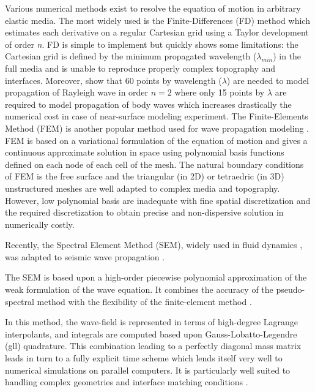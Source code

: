 \documentclass[manuscript,revised]{geophysics}
\begin{document}
\noindent Various numerical methods exist to resolve the equation of motion in arbitrary elastic media. The most widely used is the Finite-Differences (FD) method \citep{Virieux_PSV_1986,Levander_PSV_1988,Robertsson_FDM_1994,Pratt_EWM_1990,Stekl_VEM_1998,Saenger_FDM_2004} which estimates each derivative on a regular Cartesian grid using a Taylor development \citep{Moczo_FDM_2004} of order \textit{n}. FD is simple to implement but quickly shows some limitations: the Cartesian grid is defined by the minimum propagated wavelength ($\lambda_{min}$) in the full media and is unable to reproduce properly complex topography and interfaces. Moreover, \citet{Saenger_FDM_2000} show that 60 points by wavelength ($\lambda$) are needed to model propagation of Rayleigh wave in order $n=2$ where only 15 points by $\lambda$ are required to model propagation of body waves which increases drastically the numerical cost in case of near-surface modeling experiment. The Finite-Elements Method (FEM) is another popular method used for wave propagation modeling \citep{Lysmer_FEM_1972,Seron_FEM_1990,Hulbert_FEM_1990}. FEM is based on a variational formulation of the equation of motion and gives a continuous approximate solution in space using polynomial basis functions defined on each node of each cell of the mesh. The natural boundary conditions of FEM is the free surface and the triangular (in 2D) or tetraedric (in 3D) unstructured meshes are well adapted to complex media and topography. However, low polynomial basis are inadequate with fine spatial discretization and the required discretization to obtain precise and non-dispersive solution in numerically costly. 

\noindent Recently, the Spectral Element Method (SEM), widely used in fluid dynamics \citep{Patera_SEM_1984,Korczak_SEM_1986,Karniadakis_FEM_1989}, was adapted to seismic wave propagation \citep{Komatitsch_SEM_1998,Komatitsch_ISM_1999,Komatitsch_SEM_2005,Festa_PML_2005}. 

\noindent The SEM is based upon a high-order piecewise polynomial approximation of the weak formulation of the wave equation. It combines the accuracy of the pseudo-spectral method with the flexibility of the finite-element method \citep{Tromp_SEM_2008}. 

\noindent In this method, the wave-field is represented in terms of high-degree Lagrange interpolants, and integrals are computed based upon Gauss-Lobatto-Legendre (gll) quadrature. This combination leading to a perfectly diagonal mass matrix leads in turn to a fully explicit time scheme which lends itself very well to numerical simulations on parallel computers. It is particularly well suited to handling complex geometries and interface matching conditions \citep{Cristini_SEM_2012}. 
\end{document}
